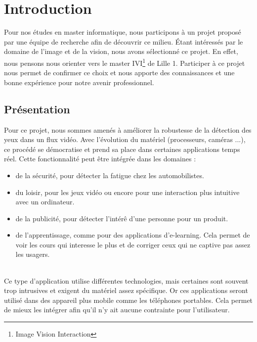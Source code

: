 \section{Introduction}

Pour nos études en master informatique, nous participons à un projet proposé par une 
équipe de recherche afin de découvrir ce milieu. 
Étant intéressés par le domaine de l'image et de la vision, nous avons sélectionné ce projet. 
En effet, nous pensons nous orienter vers le master IVI\footnote{Image Vision Interaction} de 
Lille 1. Participer à ce projet nous permet de confirmer ce choix et nous apporte des 
connaissances et une bonne expérience pour notre avenir professionnel.\\

\subsection{Présentation}
Pour ce projet, nous sommes amenés à améliorer la robustesse de la détection des yeux dans un flux vidéo.
Avec l'évolution du matériel (processeurs, caméras ...), ce procédé se démocratise et prend sa place 
dans certaines applications temps réel. Cette fonctionnalité peut être intégrée dans les domaines : 
\begin{itemize}
 \item de la sécurité, pour détecter la fatigue chez les automobilistes.
 \item du loisir, pour les jeux vidéo ou encore pour une interaction plus intuitive avec un ordinateur.
 \item de la publicité, pour détecter l'intérê d'une personne pour un produit. 
 \item de l'apprentissage, comme pour des applications d'e-learning. Cela permet de voir les cours
 qui interesse le plus et de corriger ceux qui ne captive pas assez les usagers.
\end{itemize}
\ \\
Ce type d'application utilise différentes technologies, mais certaines sont souvent trop intrusives 
et exigent du matériel assez spécifique. Or ces applications seront utilisé dans des appareil plus mobile
comme les téléphones portables. Cela permet de mieux les intégrer afin qu'il n'y ait aucune contrainte pour l'utilisateur.\\



